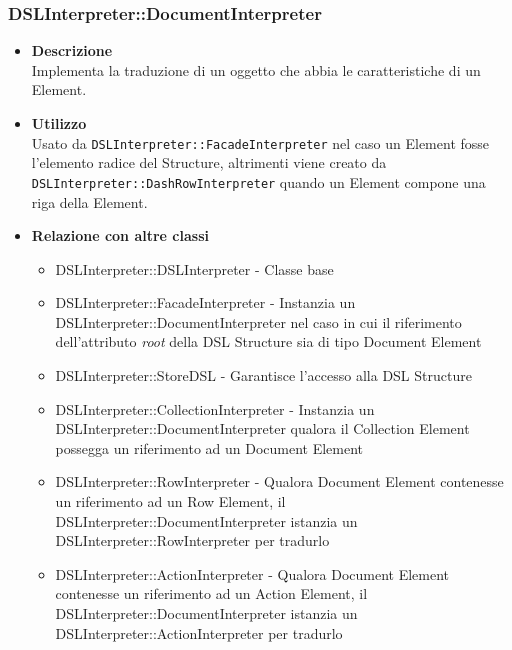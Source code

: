 \subsubsection{DSLInterpreter::DocumentInterpreter}
\begin{itemize}
\item \textbf{Descrizione} \hfill \\
  Implementa la traduzione di un oggetto che abbia le caratteristiche di un  Element.
\item \textbf{Utilizzo} \hfill \\
Usato da \texttt{DSLInterpreter::FacadeInterpreter} nel caso un  Element fosse l'elemento radice del  Structure, altrimenti viene creato da \\\texttt{DSLInterpreter::DashRowInterpreter} quando un  Element compone una riga della  Element.
\item \textbf{Relazione con altre classi}
  \begin{itemize}
  \item DSLInterpreter::DSLInterpreter - Classe base
  \item DSLInterpreter::FacadeInterpreter - Instanzia un DSLInterpreter::DocumentInterpreter nel caso in cui il riferimento dell'attributo \textit{root} della DSL Structure sia di tipo Document Element
  \item DSLInterpreter::StoreDSL - Garantisce l'accesso alla DSL Structure
  \item DSLInterpreter::CollectionInterpreter - Instanzia un DSLInterpreter::DocumentInterpreter qualora il Collection Element possegga un riferimento ad un Document Element
  \item DSLInterpreter::RowInterpreter - Qualora Document Element contenesse un riferimento ad un Row Element, il DSLInterpreter::DocumentInterpreter istanzia un DSLInterpreter::RowInterpreter per tradurlo
  \item DSLInterpreter::ActionInterpreter - Qualora Document Element contenesse un riferimento ad un Action Element, il DSLInterpreter::DocumentInterpreter istanzia un DSLInterpreter::ActionInterpreter per tradurlo
  \end{itemize}
\end{itemize}


